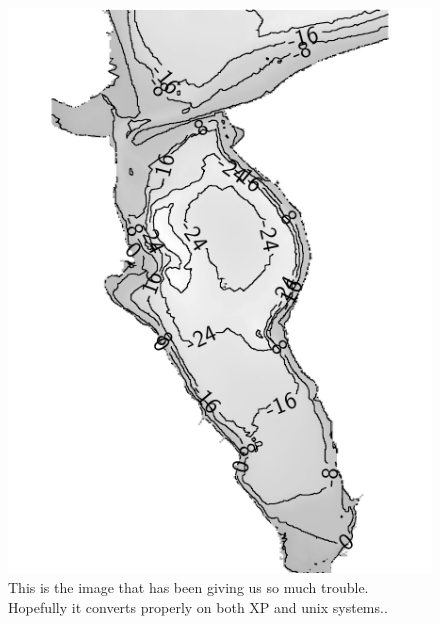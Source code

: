 \documentclass{article}
\begin{document}
\begin{figure}
\includegraphics{fig_teste.pdf}
\caption{This is the image that has been giving us so much trouble.
Hopefully it converts properly on both XP and unix systems..}
\end{figure}
\end{document}
